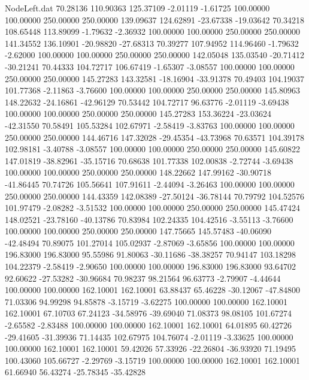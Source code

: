 \begin{filecontents}{NodeLeft.dat}
  70.28136  110.90363  125.37109    -2.01119   -1.61725  100.00000  100.00000  250.00000  250.00000  139.09637  124.62891  -23.67338  -19.03642
  70.34218  108.65448  113.89099    -1.79632   -2.36932  100.00000  100.00000  250.00000  250.00000  141.34552  136.10901  -20.98820  -27.68313
  70.39277  107.94952  114.96460    -1.79632   -2.62000  100.00000  100.00000  250.00000  250.00000  142.05048  135.03540  -20.71412  -30.21241
  70.44333  104.72717  106.67419    -1.65307   -3.08557  100.00000  100.00000  250.00000  250.00000  145.27283  143.32581  -18.16904  -33.91378
  70.49403  104.19037  101.77368    -2.11863   -3.76600  100.00000  100.00000  250.00000  250.00000  145.80963  148.22632  -24.16861  -42.96129
  70.53442  104.72717   96.63776    -2.01119   -3.69438  100.00000  100.00000  250.00000  250.00000  145.27283  153.36224  -23.03624  -42.31550
  70.58491  105.53284  102.67971    -2.58419   -3.83763  100.00000  100.00000  250.00000  250.00000  144.46716  147.32028  -29.45354  -43.73968
  70.63571  104.39178  102.98181    -3.40788   -3.08557  100.00000  100.00000  250.00000  250.00000  145.60822  147.01819  -38.82961  -35.15716
  70.68638  101.77338  102.00838    -2.72744   -3.69438  100.00000  100.00000  250.00000  250.00000  148.22662  147.99162  -30.90718  -41.86445
  70.74726  105.56641  107.91611    -2.44094   -3.26463  100.00000  100.00000  250.00000  250.00000  144.43359  142.08389  -27.50124  -36.78144
  70.79792  104.52576  101.97479    -2.08282   -3.51532  100.00000  100.00000  250.00000  250.00000  145.47424  148.02521  -23.78160  -40.13786
  70.83984  102.24335  104.42516    -3.55113   -3.76600  100.00000  100.00000  250.00000  250.00000  147.75665  145.57483  -40.06090  -42.48494
  70.89075  101.27014  105.02937    -2.87069   -3.65856  100.00000  100.00000  196.83000  196.83000   95.55986   91.80063  -30.11686  -38.38257
  70.94147  103.18298  104.22379    -2.58419   -2.90650  100.00000  100.00000  196.83000  196.83000   93.64702   92.60622  -27.53282  -30.96684
  70.98237   98.21564   96.63773    -2.79907   -4.44644  100.00000  100.00000  162.10001  162.10001   63.88437   65.46228  -30.12067  -47.84800
  71.03306   94.99298   94.85878    -3.15719   -3.62275  100.00000  100.00000  162.10001  162.10001   67.10703   67.24123  -34.58976  -39.69040
  71.08373   98.08105  101.67274    -2.65582   -2.83488  100.00000  100.00000  162.10001  162.10001   64.01895   60.42726  -29.41605  -31.39936
  71.14435  102.67975  104.76074    -2.01119   -3.33625  100.00000  100.00000  162.10001  162.10001   59.42026   57.33926  -22.26804  -36.93920
  71.19495  100.43060  105.66727    -2.29769   -3.15719  100.00000  100.00000  162.10001  162.10001   61.66940   56.43274  -25.78345  -35.42828

\end{filecontents}
